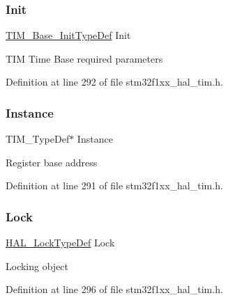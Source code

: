 \subsubsection{\texorpdfstring{Init}{Init}}
{\footnotesize\ttfamily \hyperlink{struct_t_i_m___base___init_type_def}{T\+I\+M\+\_\+\+Base\+\_\+\+Init\+Type\+Def} Init}

T\+IM Time Base required parameters 

Definition at line 292 of file stm32f1xx\+\_\+hal\+\_\+tim.\+h.

\mbox{\label{struct_t_i_m___handle_type_def_a4076faade36875a6a05767135bb70b86}} 
\subsubsection{\texorpdfstring{Instance}{Instance}}
{\footnotesize\ttfamily T\+I\+M\+\_\+\+Type\+Def$\ast$ Instance}

Register base address 

Definition at line 291 of file stm32f1xx\+\_\+hal\+\_\+tim.\+h.

\mbox{\label{struct_t_i_m___handle_type_def_ad4cf225029dbefe8d3fe660c33b8bb6b}} 
\subsubsection{\texorpdfstring{Lock}{Lock}}
{\footnotesize\ttfamily \hyperlink{stm32f1xx__hal__def_8h_ab367482e943333a1299294eadaad284b}{H\+A\+L\+\_\+\+Lock\+Type\+Def} Lock}

Locking object 

Definition at line 296 of file stm32f1xx\+\_\+hal\+\_\+tim.\+h.

\mbox{\label{struct_t_i_m___handle_type_def_ad4c7388b23a70d7a1a257d6c94df29f3}} 
